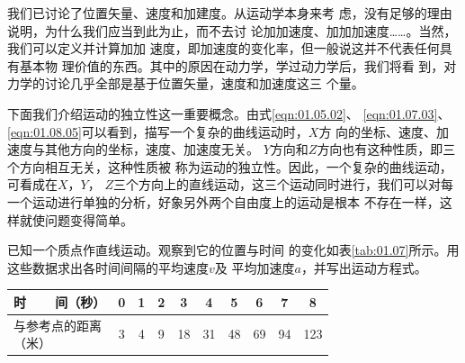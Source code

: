 我们已讨论了位置矢量、速度和加建度。从运动学本身来考
虑，没有足够的理由说明，为什么我们应当到此为止，而不去讨
论加加速度、加加加速度……。当然，我们可以定义并计算加加
速度，即加速度的变化率，但一般说这并不代表任何具有基本物
理价值的东西。其中的原因在动力学，学过动力学后，我们将看
到，对力学的讨论几乎全部是基于位置矢量，速度和加速度这三
个量。

下面我们介绍运动的独立性这一重要概念。由式\eqref{eqn:01.05.02}、
\eqref{eqn:01.07.03}、\eqref{eqn:01.08.05}可以看到，描写一个复杂的曲线运动时，$X$方
向的坐标、速度、加速度与其他方向的坐标，速度、加速度无关。
\clearpage
\noindent $Y$方向和$Z$方向也有这种性质，即三个方向相互无关，这种性质被
称为运动的独立性。因此，一个复杂的曲线运动，可看成在$X$，$Y$，
$Z$三个方向上的直线运动，这三个运动同时进行，我们可以对每
一个运动进行单独的分析，好象另外两个自由度上的运动是根本
不存在一样，这样就使问题变得简单。

\example 已知一个质点作直线运动。观察到它的位置与时间
的变化如表\ref{tab:01.07}所示。用这些数据求出各时间间隔的平均速度$v$及
平均加速度$a$，并写出运动方程式。
\begin{tablex}[!h]{0.6em}
    \caption{}
    \label{tab:01.07}
    \centering
    \begin{tabular}{l|c|c|c|c|c|c|c|c|c}
        \toprule
        时~~~~间（秒） & 0 & 1 & 2 & 3 & 4 & 5 & 6 & 7 & 8 \\
        \midrule
        \makecell{与参考点的距离                           \\（米）}  &  3  &  4  &  9  &  18  &  31  &  48  &  69  &  94 & 123 \\
        \bottomrule
    \end{tabular}
\end{tablex}


